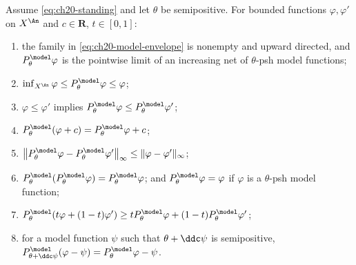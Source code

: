 \begin{theorem}
\label{thm:ch20-model-envelope}
Assume \eqref{eq:ch20-standing} and let \(\theta\) be semipositive.  For
bounded functions \(\varphi,\varphi'\) on \(X^{\An}\) and \(c\in\mathbf R\),
\(t\in[0,1]\):
\begin{enumerate}
\item\label{itm:ch20-env:directed} the family in
 \eqref{eq:ch20-model-envelope} is nonempty and upward directed, and
 \(P^{\model}_\theta\varphi\) is the pointwise limit of an increasing net of
 \(\theta\)-psh model functions;
\item\label{itm:ch20-env:bounds}
 \(\inf_{X^{\An}}\varphi\leq P^{\model}_\theta\varphi\leq\varphi\);
\item\label{itm:ch20-env:monotone} \(\varphi\leq\varphi'\) implies
 \(P^{\model}_\theta\varphi\leq P^{\model}_\theta\varphi'\);
\item\label{itm:ch20-env:translate}
 \(P^{\model}_\theta(\varphi+c)=P^{\model}_\theta\varphi+c\);
\item\label{itm:ch20-env:lipschitz}
 \(\bigl\|P^{\model}_\theta\varphi-P^{\model}_\theta\varphi'\bigr\|_\infty
   \leq\|\varphi-\varphi'\|_\infty\);
\item\label{itm:ch20-env:idem}
 \(P^{\model}_\theta(P^{\model}_\theta\varphi)=P^{\model}_\theta\varphi\);
 and \(P^{\model}_\theta\varphi=\varphi\) if \(\varphi\) is a
 \(\theta\)-psh model function;
\item\label{itm:ch20-env:concave}
 \(P^{\model}_\theta(t\varphi+(1-t)\varphi')
   \geq tP^{\model}_\theta\varphi+(1-t)P^{\model}_\theta\varphi'\);
\item\label{itm:ch20-env:reference} for a model function \(\psi\) such that
 \(\theta+\ddc\psi\) is semipositive,
 \(P^{\model}_{\theta+\ddc\psi}(\varphi-\psi)
    =P^{\model}_\theta\varphi-\psi\).
\end{enumerate}
\end{theorem}

